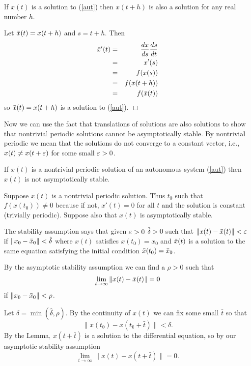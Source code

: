 \documentclass[nols]{tufte-handout}
\theoremstyle{definition}
\begin{document}
\begin{lem}
	If $x(t)$ is a solution to (\ref{aut}) then $x(t+h)$ is also a
solution for any real number $h$.
\end{lem}

\pf Let $\bar{x} (t) = x(t+h)$ and $s = t+h$.  Then
\begin{eqnarray*}
	\bar{x} ' (t) & = & {dx \over ds}{ds \over dt} \\
	& = & x'(s)\\
	& = & f(x(s))\\
	& = & f(x(t+h))\\
	& = & f(\bar{x}(t))\\
\end{eqnarray*}
so $\bar{x}(t) = x(t+h)$ is a solution to (\ref{aut}). $\Box$

Now we can use the fact that translations of solutions are also
solutions to show that nontrivial periodic solutions cannot be
asymptotically stable.  By nontrivial periodic we mean that the
solutions do not converge to a constant vector, i.e., $x(t) \neq x(t +
\varepsilon)$ for some small $\varepsilon > 0$.

\begin{thm}
	If $x(t)$ is a nontrivial periodic solution of an autonomous
	system (\ref{aut}) then $x(t)$ is not asymptotically stable.
\end{thm}

\pf Suppose $x(t)$ is a nontrivial periodic solution.  Thus \e $t_0$
such that $f(x(t_0)) \neq 0$ because if not, $x'(t) = 0$ for all $t$
and the solution is constant (trivially periodic).  Suppose also that
$x(t)$ is asymptotically stable.

The stability assumption says that given $\varepsilon > 0$ \e $\hat{\delta}
> 0$ such that $\| x(t) - \bar{x}(t) \| < \varepsilon$ if $ \| x_0 - \bar{x}_0 \| <
\hat{\delta}$ where $x(t)$ satisfies $x(t_0) = x_0$ and $\bar{x}(t)$ is a
solution to the same equation satisfying the initial condition
$\bar{x}(t_0) = \bar{x}_0$.

By the asymptotic stability assumption we can find a $\rho > 0$ such
that 
$$\lim_{t \rightarrow \infty} \| x(t) - \bar{x}(t) \| = 0$$
if $\| x_0 - \bar{x}_0 \| < \rho$.

Let $\delta = \min (\hat{\delta}, \rho)$.  By the continuity of $x(t)$
we can fix some small $\bar{t}$ so that 
$$\| x(t_0) - x(t_0 + \bar{t}) \| < \delta.$$
By the Lemma, $x(t + \bar{t})$ is a solution to the differential
equation, so by our asymptotic stability assumption
$$\lim_{t \rightarrow \infty} \| x(t) - x(t + \bar{t})\|  = 0.$$
\end{document}
